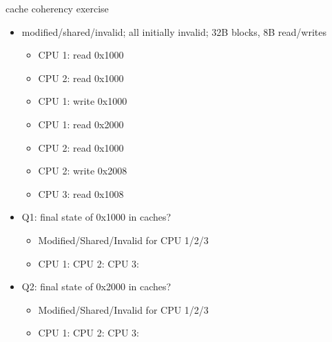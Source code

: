 \begin{frame}{cache coherency exercise}
\begin{itemize}
\item modified/shared/invalid; all initially invalid; 32B blocks, 8B read/writes
\begin{itemize}
\item CPU 1: read 0x1000
\item CPU 2: read 0x1000
\item CPU 1: write 0x1000
\item CPU 1: read 0x2000
\item CPU 2: read 0x1000
\item CPU 2: write 0x2008
\item CPU 3: read 0x1008
\end{itemize}
\item Q1: final state of 0x1000 in caches? 
    \begin{itemize}
    \item Modified/Shared/Invalid for CPU 1/2/3
    \item CPU 1: \hspace{2cm} CPU 2: \hspace{2cm} CPU 3: \hspace{2cm}
    \end{itemize}
\item Q2: final state of 0x2000 in caches? 
    \begin{itemize}
    \item Modified/Shared/Invalid for CPU 1/2/3
    \item CPU 1: \hspace{2cm} CPU 2: \hspace{2cm} CPU 3: \hspace{2cm}
    \end{itemize}
\end{itemize}
\end{frame}
